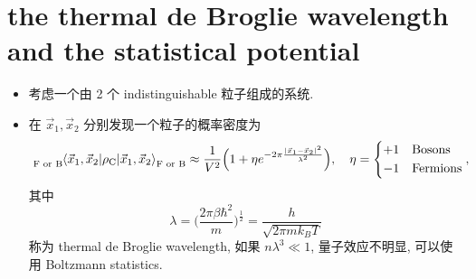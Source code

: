 \section{the thermal de Broglie wavelength and the statistical potential}
\begin{itemize}
	\item 考虑一个由 2 个 indistinguishable 粒子组成的系统.
	
	\item 在 $\vec{x}_1, \vec{x}_2$ 分别发现一个粒子的概率密度为
	\begin{equation} \label{5.4.1}
		\tensor[_{\text{F or B}}]{\braket{\vec{x}_1, \vec{x}_2 | \rho_\text{C} | \vec{x}_1, \vec{x}_2}}{_{\text{F or B}}} \approx \frac{1}{V^2} \Big( 1 + \eta e^{- 2 \pi \frac{|\vec{x}_1 - \vec{x}_2|^2}{\lambda^2}} \Big), \quad \eta = \begin{dcases}
			+ 1 & \text{Bosons} \\
			- 1 & \text{Fermions}
		\end{dcases},
	\end{equation}
	其中
	\begin{equation} \label{5.4.2}
		\lambda = \Big( \frac{2 \pi \beta \hbar^2}{m} \Big)^{\frac{1}{2}} = \frac{h}{\sqrt{2 \pi m k_B T}}
	\end{equation}
	称为 thermal de Broglie wavelength, 如果 $n \lambda^3 \ll 1$, 量子效应不明显, 可以使用 Boltzmann statistics.
	

\end{itemize}
